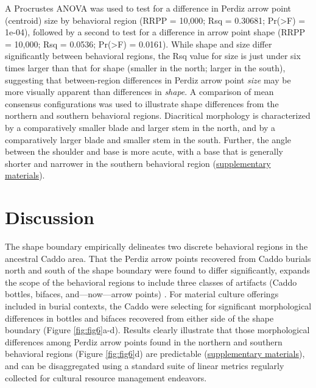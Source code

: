 \documentclass[smallextended]{svjour3}       %
\begin{document}
A Procrustes ANOVA was used to test for a difference in Perdiz arrow
point (centroid) size by behavioral region (RRPP = 10,000; Rsq =
0.30681; Pr(\textgreater F) = 1e-04), followed by a second to test for a
difference in arrow point shape (RRPP = 10,000; Rsq = 0.0536;
Pr(\textgreater F) = 0.0161). While shape and size differ significantly
between behavioral regions, the Rsq value for size is just under six
times larger than that for shape (smaller in the north; larger in the
south), suggesting that between-region differences in Perdiz arrow point
\emph{size} may be more visually apparent than differences in
\emph{shape}. A comparison of mean consensus configurations was used to
illustrate shape differences from the northern and southern behavioral
regions. Diacritical morphology is characterized by a comparatively
smaller blade and larger stem in the north, and by a comparatively
larger blade and smaller stem in the south. Further, the angle between
the shoulder and base is more acute, with a base that is generally
shorter and narrower in the southern behavioral region
(\href{https://seldenlab.github.io/perdiz3/}{supplementary materials}).

\hypertarget{discussion}{%
\section{Discussion}\label{discussion}}

The shape boundary empirically delineates two discrete behavioral
regions in the ancestral Caddo area. That the Perdiz arrow points
recovered from Caddo burials north and south of the shape boundary were
found to differ significantly, expands the scope of the behavioral
regions to include three classes of artifacts (Caddo bottles, bifaces,
and---now---arrow points)
\cite{RN8074,RN7927,RN8370,RN8312,RN8322,RN8158,RN11097}. For material
culture offerings included in burial contexts, the Caddo were selecting
for significant morphological differences in bottles and bifaces
recovered from either side of the shape boundary (Figure
\ref{fig:fig6}a-d). Results clearly illustrate that those morphological
differences among Perdiz arrow points found in the northern and southern
behavioral regions (Figure \ref{fig:fig6}d) are predictable
(\href{https://seldenlab.github.io/perdiz3/}{supplementary materials}),
and can be disaggregated using a standard suite of linear metrics
regularly collected for cultural resource management endeavors.
\end{document}
